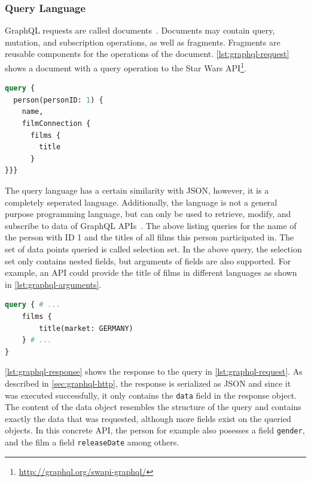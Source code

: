 \subsubsection{Query Language}

GraphQL requests are called documents~\cite{Facebook2018}.
Documents may contain query, mutation, and subscription operations, as well as fragments.
Fragments are reusable components for the operations of the document.
\autoref{lst:graphql-request} shows a document with a query operation to the Star Wars \ac{API}\footnote{\url{http://graphql.org/swapi-graphql/}}.

\begin{lstlisting}[language=graphql, caption={GraphQL Request}, label={lst:graphql-request}]
query {
  person(personID: 1) {
    name,
    filmConnection {
      films {
        title
      }
}}}
\end{lstlisting}

The query language has a certain similarity with \ac{JSON}, however, it is a completely seperated language.
Additionally, the language is not a general purpose programming language, but can only be used to retrieve, modify, and subscribe to data of GraphQL \acp{API}~\cite{Facebook2018}.
The above listing queries for the name of the person with ID 1 and the titles of all films this person participated in.
The set of data points queried is called selection set.
In the above query, the selection set only contains nested fields, but arguments of fields are also supported.
For example, an \ac{API} could provide the title of films in different languages as shown in  \autoref{lst:graphql-arguments}.

\begin{lstlisting}[language=graphql, caption={GraphQL Request with Field Arguments}, label={lst:graphql-arguments}]
query { # ...
    films {
        title(market: GERMANY)
    } # ...
}
\end{lstlisting}

\autoref{lst:graphql-response} shows the response to the query in \autoref{lst:graphql-request}.
As described in \autoref{sec:graphql-http}, the response is serialized as \ac{JSON} and since it was executed successfully, it only contains the \texttt{data} field in the response object.
The content of the data object resembles the structure of the query and contains exactly the data that was requested, although more fields exist on the queried objects.
In this concrete \ac{API}, the person for example also posesses a field \texttt{gender}, and the film a field \texttt{releaseDate} among others.

